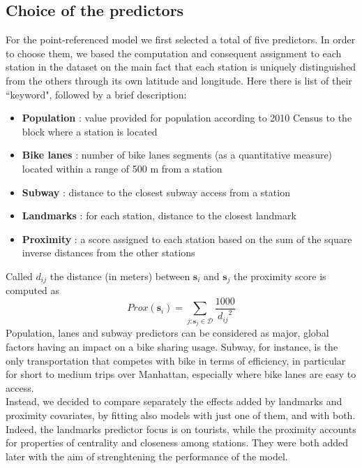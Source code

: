 \documentclass[12pt]{article}
\begin{document}
	
	\subsection{Choice of the predictors}
	For the point-referenced model we first selected a total of five predictors. In order to choose them, we based the computation and consequent assignment to each station in the dataset on the main fact that each station is uniquely distinguished from the others through its own latitude and longitude. Here there is list of their ``keyword", followed by a brief description:	
	\begin{itemize}
		\item \textbf{Population} : value provided for population according to 2010 Census to the block where a station is located \cite{populationdata}
		\item \textbf{Bike lanes} : number of bike lanes segments (as a quantitative measure) located within a range of 500 m from a station \cite{lanesdata}
		\item \textbf{Subway} : distance to the closest subway access from a station \cite{subwaydata}
		\item \textbf{Landmarks} : for each station, distance to the closest landmark\footnotemark
		\item \textbf{Proximity} : a score assigned to each station based on the sum of 	
		the square inverse distances from the other stations
	\end{itemize}
	Called $d_{ij}$ the distance (in meters) between $\boldsymbol{s}_i$ and $\boldsymbol{s}_j$ the proximity score is computed as
	$$Prox(\boldsymbol{s}_i) = \displaystyle\sum_{j:  \boldsymbol{s}_j \in \mathcal{D}}^{} \displaystyle\frac{1000}{{d_{ij}}^2}$$
	Population, lanes and subway predictors can be considered as major, global factors having an impact on a bike sharing usage. Subway, for instance, is the only transportation that competes with bike in terms of efficiency, in particular for short to medium trips over Manhattan, especially where bike lanes are easy to access.\\

\noindent
	Instead, we decided to compare separately the effects added by landmarks and proximity covariates, by fitting also models with just one of them, and with both.
	Indeed, the landmarks predictor focus is on tourists, while the proximity accounts for properties of centrality and closeness among stations. They were both added later with the aim of strenghtening the performance of the model.
	
\end{document}

